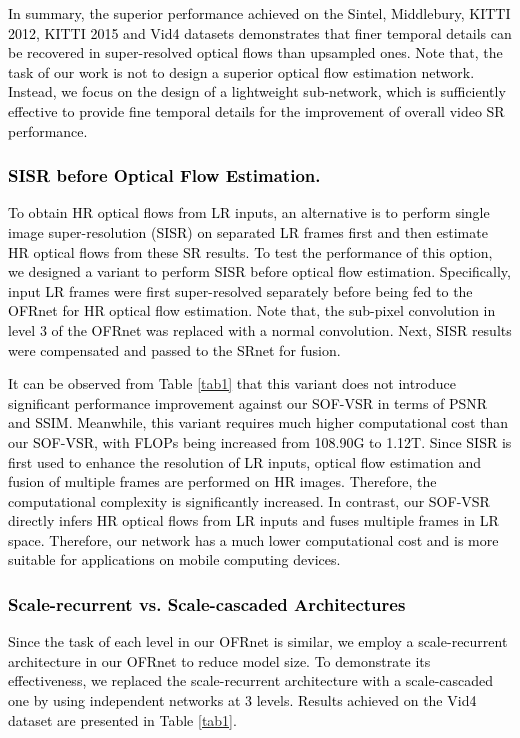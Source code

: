 \documentclass[journal]{IEEEtran}
\begin{document}
\begin{table*}[htp]
	\textcolor{black}{In summary, the superior performance achieved on the Sintel, Middlebury, KITTI 2012, KITTI 2015 and Vid4 datasets demonstrates that finer temporal details can be recovered in super-resolved optical flows than upsampled ones. \textcolor{black}{Note that, the task of our work is not to design a superior optical flow estimation network. Instead, we focus on the design of a lightweight sub-network, which is sufficiently effective to provide fine temporal details for the improvement of overall video SR performance.}}
	
	\textcolor{black}{
	\subsubsection{SISR before Optical Flow Estimation.} 
	To obtain HR optical flows from LR inputs, an alternative is to  perform single image super-resolution (SISR) on separated LR frames first and then estimate HR optical flows from these SR results. To test the performance of this option, we designed a variant to perform SISR before optical flow estimation. Specifically, input LR frames were first super-resolved separately before being fed to the OFRnet for HR optical flow estimation. Note that, the sub-pixel convolution in level 3 of the OFRnet was replaced with a normal convolution. Next, SISR results were compensated and passed to the SRnet for fusion.}
	\textcolor{black}{It can be observed from Table \ref{tab1} that this variant does not introduce significant performance improvement against our SOF-VSR in terms of PSNR and SSIM. Meanwhile, this variant requires much higher computational cost than our SOF-VSR, with FLOPs being increased from 108.90G to 1.12T. Since SISR is first used to enhance the resolution of LR inputs, optical flow estimation and fusion of multiple frames are performed on HR images. Therefore, the computational complexity is significantly increased. In contrast, our SOF-VSR directly infers HR optical flows  from LR inputs and fuses multiple frames in LR space. Therefore, our network has a much lower computational cost and is more suitable for applications on mobile computing devices.} 
		
	\textcolor{black}{		
	\subsubsection{Scale-recurrent vs. Scale-cascaded Architectures} 
	Since the task of each level in our OFRnet is similar, we employ a scale-recurrent architecture in our OFRnet to reduce model size. To demonstrate its effectiveness, we replaced the scale-recurrent architecture with a scale-cascaded one by using independent networks at 3 levels. Results achieved on the Vid4 dataset are presented in Table \ref{tab1}.}
	

\end{table*}
\end{document}

